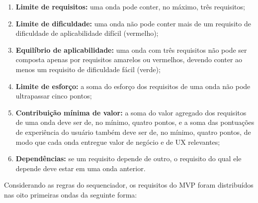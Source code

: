 \begin{enumerate}
    \item \textbf{Limite de requisitos:} uma onda pode conter, no máximo, três requisitos;
    \item \textbf{Limite de dificuldade:} uma onda não pode conter mais de um requisito de dificuldade de aplicabilidade difícil (vermelho);
    \item \textbf{Equilíbrio de aplicabilidade:} uma onda com três requisitos não pode ser composta apenas por requisitos amarelos ou vermelhos, devendo conter ao menos um requisito de dificuldade fácil (verde);
    \item \textbf{Limite de esforço:} a soma do esforço dos requisitos de uma onda não pode ultrapassar cinco pontos;
    \item \textbf{Contribuição mínima de valor:} a soma do valor agregado dos requisitos de uma onda deve ser de, no mínimo, quatro pontos, e a soma das pontuações de experiência do usuário também deve ser de, no mínimo, quatro pontos, de modo que cada onda entregue valor de negócio e de UX relevantes;
    \item \textbf{Dependências:} se um requisito depende de outro, o requisito do qual ele depende deve estar em uma onda anterior.
\end{enumerate}

Considerando as regras do sequenciador, os requisitos do MVP foram distribuídos nas oito primeiras ondas da seguinte forma:

